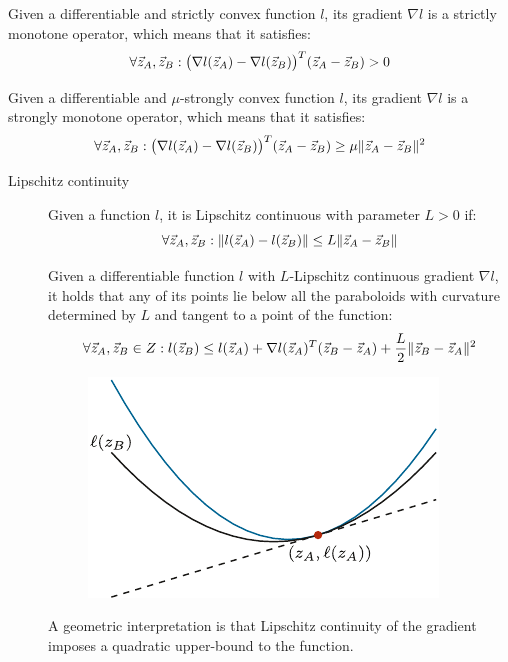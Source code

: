 \begin{lemma} 
    Given a differentiable and strictly convex function $l$, its gradient $\nabla l$ is a strictly monotone operator, which means that it satisfies:
    \[
        \forall {\vec{z}}_A, {\vec{z}}_B: \big( \nabla l({\vec{z}}_A) - \nabla l({\vec{z}}_B) \big)^T ({\vec{z}}_A - {\vec{z}}_B) > 0
    \]
\end{lemma}

\begin{lemma} 
    Given a differentiable and $\mu$-strongly convex function $l$, its gradient $\nabla l$ is a strongly monotone operator, which means that it satisfies:
    \[
        \forall {\vec{z}}_A, {\vec{z}}_B: \big( \nabla l({\vec{z}}_A) - \nabla l({\vec{z}}_B) \big)^T ({\vec{z}}_A - {\vec{z}}_B) \geq \mu \Vert {\vec{z}}_A - {\vec{z}}_B \Vert^2
    \]
\end{lemma}

\begin{description}
    \item[Lipschitz continuity] 
        Given a function $l$, it is Lipschitz continuous with parameter $L > 0$ if:
        \[
            \forall {\vec{z}}_A, {\vec{z}}_B: \Vert l({\vec{z}}_A) - l({\vec{z}}_B) \Vert \leq L \Vert {\vec{z}}_A - {\vec{z}}_B \Vert
        \]

        \begin{remark}
            Given a differentiable function $l$ with $L$-Lipschitz continuous gradient $\nabla l$, it holds that any of its points lie below all the paraboloids with curvature determined by $L$ and tangent to a point of the function:
            \[ \forall {\vec{z}}_A, {\vec{z}}_B \in Z: l({\vec{z}}_B) \leq l({\vec{z}}_A) + \nabla l({\vec{z}}_A)^T ({\vec{z}}_B - {\vec{z}}_A) + \frac{L}{2} \Vert {\vec{z}}_B - {\vec{z}}_A \Vert^2 \]

            \begin{figure}[H]
                \centering
                \includegraphics[width=0.35\linewidth]{img/_lipschitz_gradient.pdf}
            \end{figure}

            A geometric interpretation is that Lipschitz continuity of the gradient imposes a quadratic upper-bound to the function.
        \end{remark}
\end{description}


